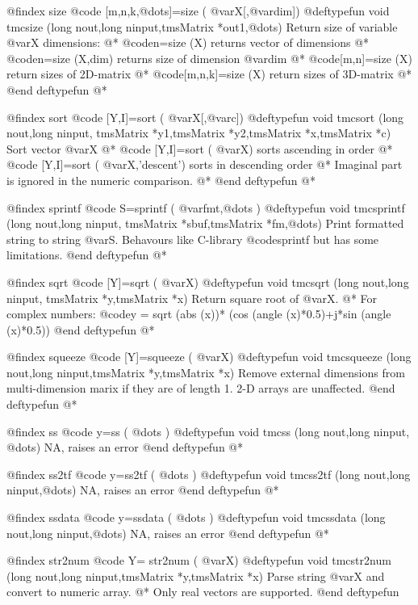 @findex  size
@code{  [m,n,k,@dots{}]=size  ( @var{X}[,@var{dim}])}
@deftypefun void tmcsize  (long nout,long ninput,tmsMatrix *out1,@dots{})
Return size of variable @var{X} dimensions: @*
@code{n=size (X)} returns vector of dimensions @*
@code{n=size (X,dim)} returns size of dimension @var{dim} @*
@code{[m,n]=size (X) } return sizes of 2D-matrix @*
@code{[m,n,k]=size (X) } return sizes of 3D-matrix @*
@end deftypefun
@*


@findex  sort
@code{  [Y,I]=sort  ( @var{X}[,@var{c}])}
@deftypefun void tmcsort  (long nout,long ninput, tmsMatrix *y1,tmsMatrix *y2,tmsMatrix *x,tmsMatrix *c)
Sort vector @var{X} @*
@code{ [Y,I]=sort  ( @var{X})} sorts ascending in  order @*
@code{ [Y,I]=sort  ( @var{X},'descent')} sorts in descending order @*
Imaginal part is ignored in the numeric comparison. @*
@end deftypefun
@*

@findex sprintf
@code{  S=sprintf  ( @var{fmt},@dots{} )}
@deftypefun void tmcsprintf  (long nout,long ninput, tmsMatrix *sbuf,tmsMatrix *fm,@dots{})
Print formatted string to string @var{S}. Behavours like C-library @code{sprintf} but has some limitations.
@end deftypefun
@*


@findex  sqrt
@code{  [Y]=sqrt  ( @var{X})}
@deftypefun void tmcsqrt  (long nout,long ninput, tmsMatrix *y,tmsMatrix *x)
Return square root of @var{X}. @*
For complex numbers: @code{y = sqrt (abs (x))* (cos (angle (x)*0.5)+j*sin (angle (x)*0.5)) }
@end deftypefun
@*

@findex  squeeze
@code{  [Y]=squeeze  ( @var{X})}
@deftypefun void tmcsqueeze  (long nout,long ninput,tmsMatrix *y,tmsMatrix *x)
Remove external  dimensions from multi-dimension marix if they are of length 1.  2-D arrays are unaffected.
@end deftypefun
@*

 

@findex  ss
@code{ y=ss  (   @dots{} )}
@deftypefun void tmcss  (long nout,long ninput, @dots{})
NA, raises  an error
@end deftypefun
@*

@findex  ss2tf
@code{ y=ss2tf  (   @dots{} )}
@deftypefun void tmcss2tf  (long nout,long ninput,@dots{})
NA, raises  an error
@end deftypefun
@*


@findex ssdata
@code{ y=ssdata  (   @dots{} )}
@deftypefun void tmcssdata  (long nout,long ninput,@dots{})
NA, raises  an error
@end deftypefun
@*

 
@findex   str2num
@code{  Y= str2num ( @var{X})}
@deftypefun void tmcstr2num  (long nout,long ninput,tmsMatrix *y,tmsMatrix *x)
Parse string @var{X} and convert to numeric array. @*  Only real vectors are supported.
@end deftypefun

